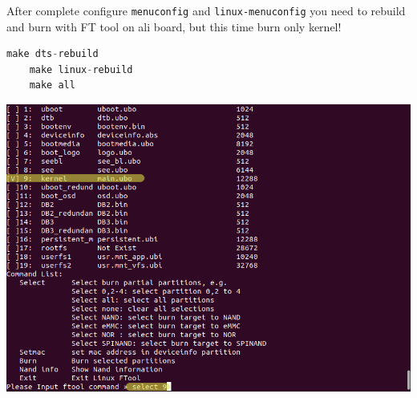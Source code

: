 \documentclass[12pt]{report}
\newcommand{\code}[1]{\texttt{#1}} %
\begin{document}
After complete configure \code{menuconfig} and \code{linux-menuconfig} you need to rebuild and burn with FT tool on ali board, but
this time burn only kernel! \newline
\begin{lstlisting}[language=C]
    make dts-rebuild
    make linux-rebuild
    make all
\end{lstlisting}
\includegraphics[scale=0.55]{5.PNG}
\end{document}
